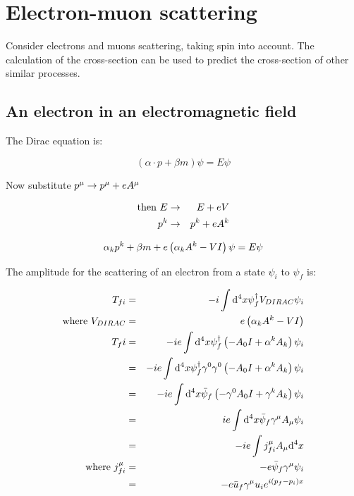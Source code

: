 \section{Electron-muon scattering}

Consider electrons and muons scattering, taking spin into account.  The calculation of the cross-section can be used to predict the cross-section of other similar processes.

\subsection{An electron in an electromagnetic field}

The Dirac equation is:

\[
  \left(\alpha\cdot p + \beta m\right)\psi = E \psi
\]

Now substitute $p^{\mu} \to p^{\mu} + e A^{\mu}$

\begin{eqnarray*}
  \textrm{then } E & \to & E + e V \\
  p^k & \to & p^k + e A^k
\end{eqnarray*}

\[
  \alpha_kp^k + \beta m + e\left(\alpha_kA^k - VI\right) \psi = E\psi
\]

The amplitude for the scattering of an electron from a state $\psi_i$ to $\psi_f$ is:

\begin{eqnarray*}
  T_{fi} & = & -i\int \mathrm{d}^4x \psi_f^{\dagger}V_{DIRAC}\psi_i \\
  \textrm{where }V_{DIRAC} & = & e\left(\alpha_kA^k -VI\right) \\
  T_fi & = & -ie\int\mathrm{d}^4x\psi_{f}^{\dagger}\left(-A_0I + \alpha^kA_k\right)\psi_i \\
  & = & -ie\int\mathrm{d}^4x\psi_{f}^{\dagger}\gamma^0\gamma^0\left(-A_0I + \alpha^kA_k\right)\psi_i \\
  & = & -ie\int\mathrm{d}^4x\bar{\psi}_f\left(-\gamma^0A_0I + \gamma^kA_k\right)\psi_i \\
  & = & ie\int\mathrm{d}^4x\bar{\psi}_f\gamma^{\mu}A_{\mu}\psi_i \\
  & = & -ie\int j^{\mu}_{fi}A_{\mu}\mathrm{d}^4x \\
  \textrm{where } j^{\mu}_{fi} & = & -e\bar{\psi}_f\gamma^{\mu}\psi_i \\
  & = & -e\bar{u}_f \gamma^{\mu}u_ie^{i\left(p_f - p_i\right)x}
\end{eqnarray*}

